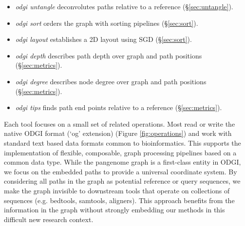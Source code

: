 \documentclass{bioinfo}
\begin{document}
\begin{itemize}
\item \textit{odgi untangle} deconvolutes paths relative to a reference (\S\ref{sec:untangle}).
\item \textit{odgi sort} orders the graph with sorting pipelines (\S\ref{sec:sort}).
\item \textit{odgi layout} establishes a 2D layout using SGD (\S\ref{sec:sort}).
\item \textit{odgi depth} describes path depth over graph and path positions (\S\ref{sec:metrics}).
\item \textit{odgi degree} describes node degree over graph and path positions (\S\ref{sec:metrics}).
\item \textit{odgi tips} finds path end points relative to a reference (\S\ref{sec:metrics}).
\end{itemize}

Each tool focuses on a small set of related operations.
Most read or write the native ODGI format (`og' extension) (Figure \ref{fig:operations}) and work with standard text based data formats common to bioinformatics.
This supports the implementation of flexible, composable, graph processing pipelines based on a common data type.
While the pangenome graph is a first-class entity in ODGI, we focus on the embedded paths to provide a universal coordinate system.
By considering all paths in the graph as potential reference or query sequences, we make the graph invisible to downstream tools that operate on collections of sequences (e.g. bedtools, samtools, aligners).
This approach benefits from the information in the graph without strongly embedding our methods in this difficult new research context.



\end{document}
